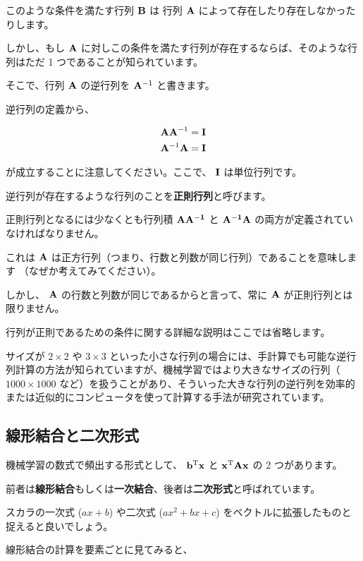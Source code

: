 このような条件を満たす行列 ${\bf B}$ は 行列 ${\bf A}$ によって存在したり存在しなかったりします。

しかし、もし ${\bf A}$ に対しこの条件を満たす行列が存在するならば、そのような行列はただ 1 つであることが知られています。

そこで、行列 ${\bf A}$ の逆行列を ${\bf A}^{-1}$ と書きます。


逆行列の定義から、


\[
\begin{aligned}
{\bf AA}^{-1} = {\bf I} \\
{\bf A}^{-1}{\bf A} = {\bf I}
\end{aligned}
\]


が成立することに注意してください。ここで、 ${\bf I}$ は単位行列です。


逆行列が存在するような行列のことを\textbf{正則行列}と呼びます。

正則行列となるには少なくとも行列積 ${\bf AA^{-1}}$ と ${\bf A^{-1}A}$ の両方が定義されていなければなりません。

これは ${\bf A}$ は正方行列（つまり、行数と列数が同じ行列）であることを意味します （なぜか考えてみてください）。

しかし、 ${\bf A}$ の行数と列数が同じであるからと言って、常に ${\bf A}$ が正則行列とは限りません。

行列が正則であるための条件に関する詳細な説明はここでは省略します。


サイズが $2 \times 2$ や $3 \times 3$ といった小さな行列の場合には、手計算でも可能な逆行列計算の方法が知られていますが、機械学習ではより大きなサイズの行列（ $1000 \times 1000$ など）を扱うことがあり、そういった大きな行列の逆行列を効率的または近似的にコンピュータを使って計算する手法が研究されています。


\subsection{線形結合と二次形式}


機械学習の数式で頻出する形式として、 ${\bf b}^{\rm T}{\bf x}$ と ${\bf x}^{\rm T}{\bf A}{\bf x}$ の 2 つがあります。

前者は\textbf{線形結合}もしくは\textbf{一次結合}、後者は\textbf{二次形式}と呼ばれています。

スカラの一次式 ($ax + b$) や二次式 ($ax^2 + bx + c$) をベクトルに拡張したものと捉えると良いでしょう。


線形結合の計算を要素ごとに見てみると、


